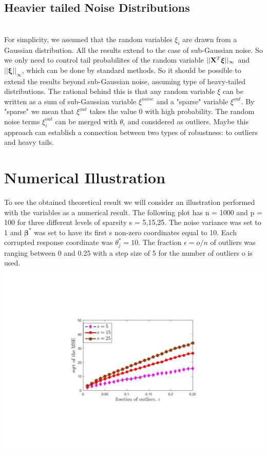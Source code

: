 \documentclass[a4paper,10pt]{article}
\theoremstyle{definition}
\begin{document}
\subsection{Heavier tailed Noise Distributions}\ \\
For simplicity, we assumed that the random variables $\xi_i$ are drawn from a Gaussian distribution. All the results extend to the case of sub-Gaussian noise. So we only need to control tail probabilites of the random variable $||\bold{X}^T\boldsymbol{\xi}||_{\infty}$ and $||\boldsymbol{\xi}||_{\infty}$, which can be done by standard methods. So it should be possible to extend the results beyond sub-Gaussian noise, assuming type of heavy-tailed distributions. The rational behind this is that any random variable $\xi$ can be written as a sum of sub-Gaussian variable $\xi^{noise}$ and a "sparse" variable $\xi^{out}$. By "sparse" we mean that $\xi^{out}$ takes the value 0 with high probability. The random noise terms $\xi_i^{out}$ can be merged with $\theta_i$ and considered as outliers. Maybe this approach can establish a connection between two types of robustness: to outliers and heavy tails.


\section{Numerical Illustration}

To see the obtained theoretical result we will consider an illustration performed with the variables as a numerical result. The following plot has n = 1000 and p = 100 for three different levels of sparsity s = 5,15,25. The noise variance was set to 1 and $\boldsymbol{\beta}^*$ was set to have its first s non-zero coordinates equal to 10. Each corrupted response coordinate was $\theta^*_j = 10$. The fraction $\epsilon = o/n$ of outliers was ranging between 0 and 0.25 with a step size of 5 for the number of outliers o is used.
\centering
\includegraphics{numerical_illustration.pdf}
\end{document}
